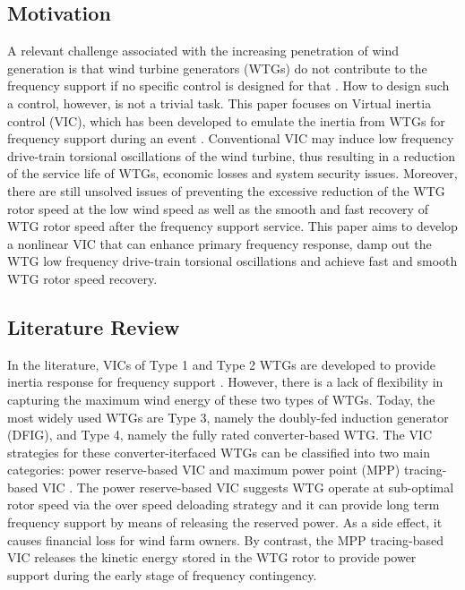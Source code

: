 \documentclass[journal]{IEEEtran}
\begin{document}
\subsection{Motivation}  
A relevant challenge associated with the increasing penetration of wind generation is that wind turbine generators (WTGs) do not contribute to the frequency support if no specific control is designed for that \cite{Zhao2017Data, pscc2018}. How to design such a control, however, is not a trivial task. This paper focuses on Virtual inertia control (VIC), which has been developed to emulate the inertia from WTGs for frequency support during an event \cite{Wang2017Control}. Conventional VIC may induce low frequency drive-train torsional oscillations of the wind turbine, thus resulting in a reduction of the service life of WTGs, economic losses and system security issues.  Moreover, there are still unsolved issues of preventing the excessive reduction of the WTG rotor speed at the low wind speed as well as the smooth and fast recovery of WTG rotor speed after the frequency support service.  This paper aims to develop a nonlinear VIC that can enhance primary frequency response, damp out the WTG low frequency drive-train torsional oscillations and achieve fast and smooth WTG rotor speed recovery.

\vspace{-0.3cm}
\subsection{Literature Review}
In the literature, VICs of Type 1 and Type 2 WTGs are developed to provide inertia response for frequency support \cite{Muljadi2012Understanding}. However, there is a lack of flexibility in capturing the maximum wind energy of these two types of WTGs. Today, the most widely used WTGs are Type 3, namely the doubly-fed induction generator (DFIG), and Type 4, namely the fully rated converter-based WTG. The VIC strategies for these converter-iterfaced WTGs can be classified into two main categories: power reserve-based VIC \cite{Vidyanandan2013Primary, Hua2016Analytical} and maximum power point (MPP) tracing-based VIC \cite{Morren2006Inertial, Morren2006Wind, Margaris2012Frequency, Min2016Dynamic, Ullah2008Temporary, Itani2011Short}. The power reserve-based VIC suggests WTG operate at sub-optimal rotor speed via the over speed deloading strategy and it can provide long term frequency support by means of releasing the reserved power. As a side effect, it causes financial loss for wind farm owners. By contrast, the MPP tracing-based VIC releases the kinetic energy stored in the WTG rotor to provide power support during the early stage of frequency contingency. 
\end{document}
